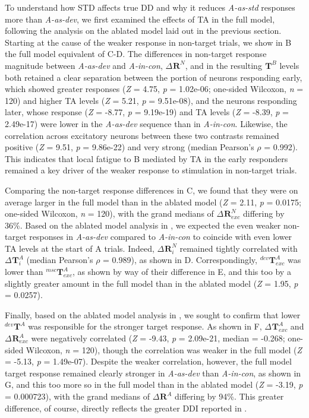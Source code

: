 \documentclass[9pt,lineno,onehalfspacing]{elife}
\newcommand{\dev}{\textit{A-as-dev}}
\newcommand{\msc}{\textit{A-in-con}}
\newcommand{\std}{\textit{A-as-std}}
\newcommand{\R}[3][]{{}^{#1}_{}\boldsymbol R^{#2}_{#3}}
\newcommand{\T}[3][]{{}^{#1}_{}\boldsymbol T^{#2}_{#3}}
\begin{document}
To understand how STD affects true DD and why it reduces \std{} responses more than \dev{}, we first examined the effects of TA in the full model, following the analysis on the ablated model laid out in the previous section. Starting at the cause of the weaker response in non-target trials, we show in B the full model equivalent of C-D. The differences in non-target response magnitude between \dev{} and \msc{}, $\Delta \R{N}{}$, and in the resulting $\T{B}{}$ levels both retained a clear separation between the portion of neurons responding early, which showed greater responses (\textit{Z} = 4.75, \textit{p} = 1.02e-06; one-sided Wilcoxon, \textit{n} = 120) and higher TA levels (\textit{Z} = 5.21, \textit{p} = 9.51e-08), and the neurons responding later, whose response (\textit{Z} = -8.77, \textit{p} = 9.19e-19) and TA levels (\textit{Z} = -8.39, \textit{p} = 2.49e-17) were lower in the \dev{} sequence than in \msc{}. Likewise, the correlation across excitatory neurons between these two contrasts remained positive (\textit{Z} = 9.51, \textit{p} = 9.86e-22) and very strong (median Pearson's $\rho$ = 0.992). This indicates that local fatigue to B mediated by TA in the early responders remained a key driver of the weaker response to stimulation in non-target trials.

Comparing the non-target response differences in C, we found that they were on average larger in the full model than in the ablated model (\textit{Z} = 2.11, \textit{p} = 0.0175; one-sided Wilcoxon, \textit{n} = 120), with the grand medians of $\Delta \R{N}{exc}$ differing by 36\%. Based on the ablated model analysis in , we expected the even weaker non-target responses in \dev{} compared to \msc{} to coincide with even lower TA levels at the start of A trials. Indeed, $\Delta \R{N}{i}$ remained tightly correlated with $\Delta \T{A}{i}$ (median Pearson's $\rho$ = 0.989), as shown in D. Correspondingly, $\T[dev]{A}{exc}$ was lower than $\T[msc]{A}{exc}$, as shown by way of their difference in E, and this too by a slightly greater amount in the full model than in the ablated model (\textit{Z} = 1.95, \textit{p} = 0.0257).

Finally, based on the ablated model analysis in , we sought to confirm that lower $\T[dev]{A}{}$ was responsible for the stronger target response. As shown in F, $\Delta \T{A}{exc}$ and $\Delta \R{A}{exc}$ were negatively correlated (\textit{Z} = -9.43, \textit{p} = 2.09e-21, median = -0.268; one-sided Wilcoxon, \textit{n} = 120), though the correlation was weaker in the full model (\textit{Z} = -5.13, \textit{p} = 1.49e-07). Despite the weaker correlation, however, the full model target response remained clearly stronger in \dev{} than \msc{}, as shown in G, and this too more so in the full model than in the ablated model (\textit{Z} = -3.19, \textit{p} = 0.000723), with the grand medians of $\Delta \R{A}{}$ differing by 94\%. This greater difference, of course, directly reflects the greater DDI reported in .
\end{document}
